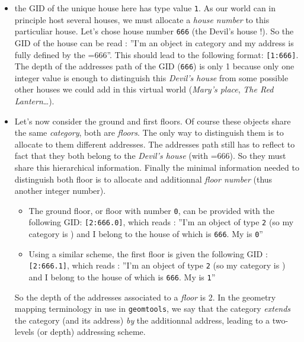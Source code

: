 \begin{itemize}

\item the GID of the unique  house here has type value \texttt{1}.  As
  our world can  in principle host several houses,  we must allocate a
  \emph{house  number} to  this particuliar  house. Let's  chose house
  number \texttt{666} (the  Devil's house !). So the  GID of the house
  can be read : ''I'm an  object in category  and my address
  is fully defined by the =666''. This should lead to
  the following  format: \verb+[1:666]+.   The depth of  the addresses
  path of the  GID (\texttt{666}) is only 1 because only one  integer value is enough
  to distinguish this \emph{Devil's house} from some possible other houses
  we could add in this virtual world (\emph{Mary's place}, \emph{The Red Lantern}\dots).

\item Let's now consider the ground and first floors. Of course these
  objects share the same \emph{category}, both are \emph{floors}.  The
  only  way to  distinguish  them  is to  allocate  to them  different
  addresses.  The  addresses path  still has to  reflect to  fact that
  they    both   belong    to   the    \emph{Devil's    house}   (with
  =666).   So  they  must  share  this  hierarchical
  information. Finally  the minimal information  needed to distinguish
  both floor is to  allocate and additionnal \emph{floor number} (thus
  another integer number).
  \begin{itemize}
 
  \item  The ground  floor, or  floor with  number \texttt{0},  can be
    provided with  the following GID: \verb+[2:666.0]+,  which reads :
    ''I'm an object of type  \texttt{2} (so my category is )
    and  I  belong  to   the  house  of  which    is
    \texttt{666}.  My  is \texttt{0}''

  \item  Using  a  similar  scheme,  the first  floor  is  given  the
    following GID : \verb+[2:666.1]+, which reads : ''I'm an object of
    type \texttt{2} (so my category is ) and I belong to the
    house   of   which      is   \texttt{666}.    My
     is \texttt{1}''
  \end{itemize}
\pn So the  depth of the addresses associated to  a \emph{floor} is 2.
In the  geometry mapping terminology in use  in \texttt{geomtools}, we
say  that  the     category  \emph{extends}  the  
category   (and   its     address)   \emph{by}   the
additionnal   address, leading  to a  two-levels (or
depth) addressing scheme.


\end{itemize}

